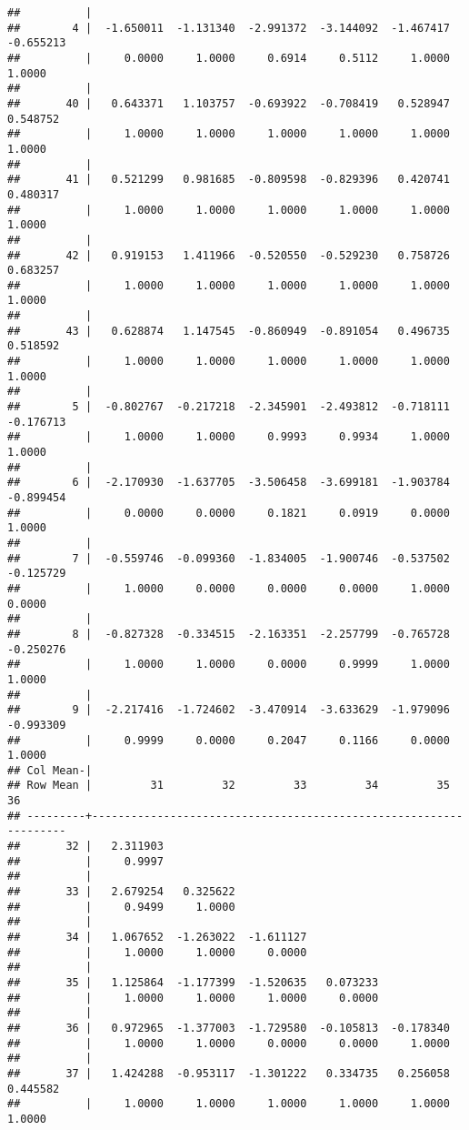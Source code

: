 \documentclass[12pt,]{article}
\begin{document}
\begin{verbatim}
##          |
##        4 |  -1.650011  -1.131340  -2.991372  -3.144092  -1.467417  -0.655213
##          |     0.0000     1.0000     0.6914     0.5112     1.0000     1.0000
##          |
##       40 |   0.643371   1.103757  -0.693922  -0.708419   0.528947   0.548752
##          |     1.0000     1.0000     1.0000     1.0000     1.0000     1.0000
##          |
##       41 |   0.521299   0.981685  -0.809598  -0.829396   0.420741   0.480317
##          |     1.0000     1.0000     1.0000     1.0000     1.0000     1.0000
##          |
##       42 |   0.919153   1.411966  -0.520550  -0.529230   0.758726   0.683257
##          |     1.0000     1.0000     1.0000     1.0000     1.0000     1.0000
##          |
##       43 |   0.628874   1.147545  -0.860949  -0.891054   0.496735   0.518592
##          |     1.0000     1.0000     1.0000     1.0000     1.0000     1.0000
##          |
##        5 |  -0.802767  -0.217218  -2.345901  -2.493812  -0.718111  -0.176713
##          |     1.0000     1.0000     0.9993     0.9934     1.0000     1.0000
##          |
##        6 |  -2.170930  -1.637705  -3.506458  -3.699181  -1.903784  -0.899454
##          |     0.0000     0.0000     0.1821     0.0919     0.0000     1.0000
##          |
##        7 |  -0.559746  -0.099360  -1.834005  -1.900746  -0.537502  -0.125729
##          |     1.0000     0.0000     0.0000     0.0000     1.0000     0.0000
##          |
##        8 |  -0.827328  -0.334515  -2.163351  -2.257799  -0.765728  -0.250276
##          |     1.0000     1.0000     0.0000     0.9999     1.0000     1.0000
##          |
##        9 |  -2.217416  -1.724602  -3.470914  -3.633629  -1.979096  -0.993309
##          |     0.9999     0.0000     0.2047     0.1166     0.0000     1.0000
## Col Mean-|
## Row Mean |         31         32         33         34         35         36
## ---------+------------------------------------------------------------------
##       32 |   2.311903
##          |     0.9997
##          |
##       33 |   2.679254   0.325622
##          |     0.9499     1.0000
##          |
##       34 |   1.067652  -1.263022  -1.611127
##          |     1.0000     1.0000     0.0000
##          |
##       35 |   1.125864  -1.177399  -1.520635   0.073233
##          |     1.0000     1.0000     1.0000     0.0000
##          |
##       36 |   0.972965  -1.377003  -1.729580  -0.105813  -0.178340
##          |     1.0000     1.0000     0.0000     0.0000     1.0000
##          |
##       37 |   1.424288  -0.953117  -1.301222   0.334735   0.256058   0.445582
##          |     1.0000     1.0000     1.0000     1.0000     1.0000     1.0000

\end{verbatim}
\end{document}
